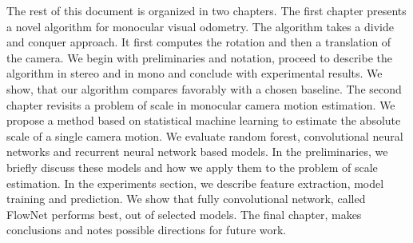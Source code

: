 The rest of this document is organized in two chapters.  The first
chapter presents a novel algorithm for monocular visual odometry.  The
algorithm takes a divide and conquer approach.  It first computes the
rotation and then a translation of the camera. We begin with
preliminaries and notation, proceed to describe the algorithm in
stereo and in mono and conclude with experimental results. We show,
that our algorithm compares favorably with a chosen baseline. The
second chapter revisits a problem of scale in monocular camera motion
estimation.  We propose a method based on statistical machine learning
to estimate the absolute scale of a single camera motion.  We evaluate
random forest, convolutional neural networks and recurrent neural
network based models.  In the preliminaries, we briefly discuss these
models and how we apply them to the problem of scale estimation.  In
the experiments section, we describe feature extraction, model
training and prediction.  We show that fully convolutional network,
called FlowNet performs best, out of selected models.  The final
chapter, makes conclusions and notes possible directions for future
work.

